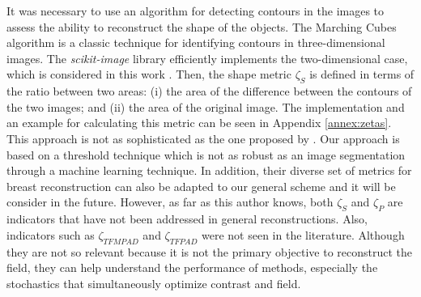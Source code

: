 				It was necessary to use an algorithm for detecting contours in the images to assess the ability to reconstruct the shape of the objects. The Marching Cubes algorithm \citep{lorensen1987marching} is a classic technique for identifying contours in three-dimensional images. The \textit{scikit-image} library efficiently implements the two-dimensional case, which is considered in this work \citep{walt2014scikit}. Then, the shape metric $\zeta_S$ is defined in terms of the ratio between two areas: (i) the area of the difference between the contours of the two images; and (ii) the area of the original image. The implementation and an example for calculating this metric can be seen in Appendix \ref{annex:zetas}. This approach is not as sophisticated as the one proposed by \cite{kurrant2021evaluating}. Our approach is based on a threshold technique which is not as robust as an image segmentation through a machine learning technique. In addition, their diverse set of metrics for breast reconstruction can also be adapted to our general scheme and it will be consider in the future. However, as far as this author knows, both $\zeta_S$ and $\zeta_{P}$ are indicators that have not been addressed in general reconstructions. Also, indicators such as $\zeta_{TFMPAD}$ and $\zeta_{TFPAD}$ were not seen in the literature. Although they are not so relevant because it is not the primary objective to reconstruct the field, they can help understand the performance of methods, especially the stochastics that simultaneously optimize contrast and field.
				
